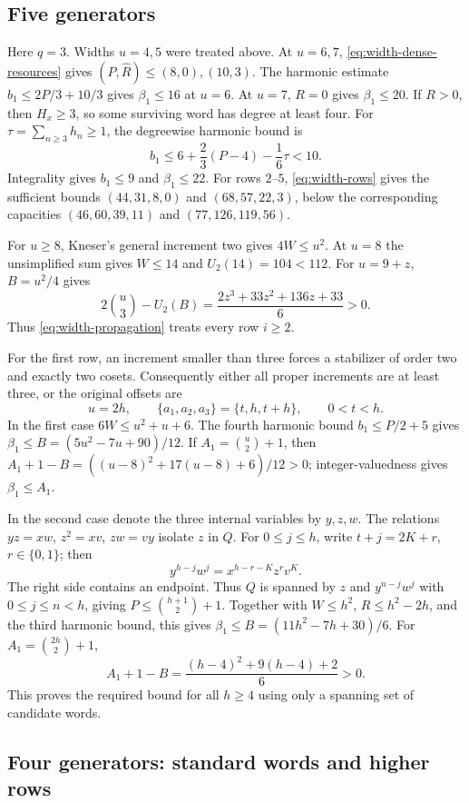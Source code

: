\subsection{Five generators}

Here $q=3$.  Widths $u=4,5$ were treated above.
At $u=6,7$, \eqref{eq:width-dense-resources} gives
$(P,\widehat R)\le(8,0),(10,3)$.
The harmonic estimate $b_1\le2P/3+10/3$ gives $\beta_1\le16$ at $u=6$.
At $u=7$, $R=0$ gives $\beta_1\le20$.
If $R>0$, then $H_x\ge3$, so some surviving word has degree at least
four.  For $\tau=\sum_{n\ge3}h_n\ge1$, the degreewise harmonic bound is
\[
 b_1\le6+\frac23(P-4)-\frac16\tau<10.
\]
Integrality gives $b_1\le9$ and $\beta_1\le22$.
For rows $2$--$5$, \eqref{eq:width-rows} gives the sufficient bounds
$(44,31,8,0)$ and $(68,57,22,3)$, below the corresponding capacities
$(46,60,39,11)$ and $(77,126,119,56)$.

For $u\ge8$, Kneser's general increment two gives $4W\le u^2$.
At $u=8$ the unsimplified sum gives $W\le14$ and $U_2(14)=104<112$.
For $u=9+z$, $B=u^2/4$ gives
\[
 2\binom u3-U_2(B)=\frac{2z^3+33z^2+136z+33}{6}>0.
\]
Thus \eqref{eq:width-propagation} treats every row $i\ge2$.

For the first row, an increment smaller than three forces a stabilizer
of order two and exactly two cosets.  Consequently either all proper
increments are at least three, or the original offsets are
\[
 u=2h,\qquad \{a_1,a_2,a_3\}=\{t,h,t+h\},\qquad 0<t<h.
\]
In the first case
$6W\le u^2+u+6$.  The fourth harmonic bound $b_1\le P/2+5$ gives
$\beta_1\le B=(5u^2-7u+90)/12$.
If $A_1=\binom u2+1$, then
$A_1+1-B=((u-8)^2+17(u-8)+6)/12>0$;
integer-valuedness gives $\beta_1\le A_1$.

In the second case denote the three internal variables by $y,z,w$.
The relations $yz=xw$, $z^2=xv$, $zw=vy$ isolate $z$ in $Q$.
For $0\le j\le h$, write $t+j=2K+r$, $r\in\{0,1\}$; then
\[
 y^{h-j}w^j=x^{h-r-K}z^rv^K.
\]
The right side contains an endpoint.  Thus $Q$ is spanned by $z$ and
$y^{n-j}w^j$ with $0\le j\le n<h$, giving
$P\le\binom{h+1}2+1$.
Together with $W\le h^2$, $R\le h^2-2h$, and the third harmonic
bound, this gives
$\beta_1\le B=(11h^2-7h+30)/6$.
For $A_1=\binom{2h}2+1$,
\[
 A_1+1-B=\frac{(h-4)^2+9(h-4)+2}{6}>0.
\]
This proves the required bound for all $h\ge4$ using only a spanning
set of candidate words.

\subsection{Four generators: standard words and higher rows}

